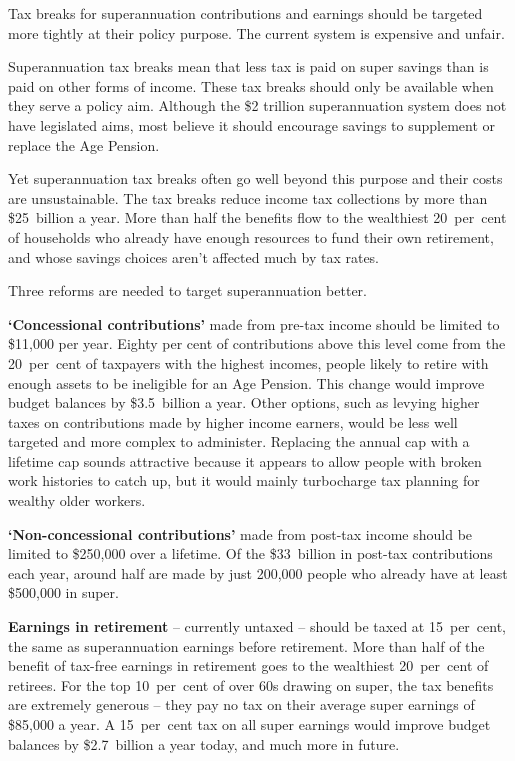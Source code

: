 

\setlength{\overviewextra}{2pt}
\addtolength{\columnsep}{\overviewextra}
\begin{overview}[-25pt]
\label{overview:SUPER}
Tax breaks for superannuation contributions and earnings should be targeted more tightly at their policy purpose. The current system is expensive and unfair. 

Superannuation tax breaks mean that less tax is paid on super savings than is paid on other forms of income. These tax breaks should only be available when they serve a policy aim. Although the \$2 trillion superannuation system does not have legislated aims, most believe it should encourage savings to supplement or replace the Age Pension. 

Yet superannuation tax breaks often go well beyond this purpose and their costs are unsustainable. The tax breaks reduce income tax collections by more than \$25~billion a year. More than half the benefits flow to the wealthiest 20~per~cent of households who already have enough resources to fund their own retirement, and whose savings choices aren’t affected much by tax rates. 

Three reforms are needed to target superannuation better.

\textbf{‘Concessional contributions’} made from pre-tax income should be limited to \$11,000 per year. Eighty per cent of contributions above this level come from the 20~per~cent of taxpayers with the highest incomes, people likely to retire with enough assets to be ineligible for an Age Pension. This change would improve budget balances by \$3.5~billion a year. Other options, such as levying higher taxes on contributions made by higher income earners, would be less well targeted and more complex to administer. Replacing the annual cap with a lifetime cap sounds attractive because it appears to allow people with broken work histories to catch up, but it would mainly turbocharge tax planning for wealthy older workers.

\textbf{‘Non-concessional contributions’} made from post-tax income
should be limited to \$250,000 over a lifetime. Of the \$33~billion in
post-tax contributions each year, around half are made by just
200,000 people who already have at least \$500,000 in super.


\textbf{Earnings in retirement} – currently untaxed – should be taxed at 15~per~cent, the same as superannuation earnings before retirement. More than half of the benefit of tax-free earnings in retirement goes to the wealthiest 20~per~cent of retirees. For the top 10~per~cent of over 60s drawing on super, the tax benefits are extremely generous – they pay no tax on their average super earnings of \$85,000 a year. A 15~per~cent tax on all super earnings would improve budget balances by \$2.7~billion a year today, and much more in future. 


\end{overview}
